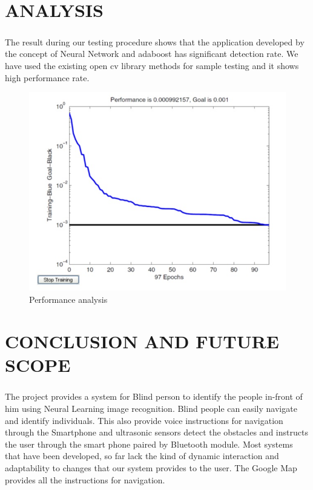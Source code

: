 \documentclass[11pt,a4paper,twoside]{report}
\begin{document}
\chapter{ANALYSIS}
\paragraph{ }The result during our testing procedure shows that the application developed by the concept of Neural Network and adaboost has significant detection rate. We have used the existing open cv library methods for sample testing and it shows high performance rate. 
\begin{figure}[htpb]
\begin{center}

\includegraphics[scale=.5]{performance}
\caption{Performance analysis}


\end{center}
\end{figure}
\chapter{CONCLUSION AND FUTURE SCOPE}
\paragraph{ }The project provides a system for Blind person to identify the people in-front of him using Neural Learning image recognition. Blind people can easily navigate and identify individuals. This also provide voice instructions for navigation through the Smartphone and ultrasonic sensors detect the obstacles and instructs the user through the smart phone paired by Bluetooth module. Most systems that have been developed, so far lack the kind of dynamic interaction and adaptability to changes that our system provides to the user. The Google Map provides all the instructions for navigation.
\end{document}
